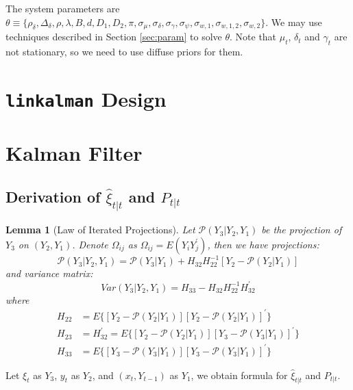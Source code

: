 \documentclass[10pt, titlepage]{article}
\newtheorem{lemma}{Lemma}
\numberwithin{equation}{section}
\begin{document}
The system parameters are $\theta\equiv\{\rho_{\delta}, \Delta_{\delta}, \rho, \lambda, B, d, D_1, D_2, \pi, \sigma_{\mu}, \sigma_{\delta}, \sigma_{\gamma}, \sigma_{\psi}, \sigma_{w,1}, \sigma_{w,1,2}, \sigma_{w,2}\}$. We may use techniques described in Section \ref{sec:param} to solve $\theta$. Note that $\mu_t$, $\delta_t$ and $\gamma_{t}$ are not stationary, so we need to use diffuse priors for them. 

\section{\texttt{linkalman} Design} \label{sec:codebase}














\pagebreak
\printbibliography
\pagebreak
\appendix

\section{Kalman Filter}
\subsection{Derivation of \texorpdfstring{$\hat{\xi}_{t|t}$}{} and \texorpdfstring{$P_{t|t}$}{}} \label{ap:iter_proj}
\begin{lemma}[Law of Iterated Projections] \label{lem:1}
    Let $\mathcal{P}(Y_3|Y_2,Y_1)$ be the projection of $Y_3$ on $(Y_2, Y_1)$. Denote $\Omega_{ij}$ as $\Omega_{ij} = E(Y_iY_j^{'})$, then we have projections:
    \[
        \mathcal{P}(Y_3|Y_2,Y_1) = \mathcal{P}(Y_3|Y_1)+H_{32}H_{22}^{-1}[Y_2 - \mathcal{P}(Y_2|Y_1)]
    \]
    and variance matrix:
    \[
        Var(Y_3|Y_2,Y_1) = H_{33} - H_{32}H_{22}^{-1}H_{32}^{'}
    \]
    where 
    \begin{align*}
        H_{22} &= E\{[Y_2-\mathcal{P}(Y_2|Y_1)][Y_2-\mathcal{P}(Y_2|Y_1)]^{'}\} \\
        H_{23} &= H_{32}^{'} = E\{[Y_2-\mathcal{P}(Y_2|Y_1)][Y_3-\mathcal{P}(Y_3|Y_1)]^{'}\} \\
        H_{33} &= E\{[Y_3-\mathcal{P}(Y_3|Y_1)][Y_3-\mathcal{P}(Y_3|Y_1)]^{'}\}
    \end{align*}
\end{lemma}

Let $\xi_t$ as $Y_3$, $y_t$ as $Y_2$, and $(x_t,Y_{t-1})$ as $Y_1$, we obtain formula for $\hat{\xi}_{t|t}$ and $P_{t|t}$.
\end{document}
